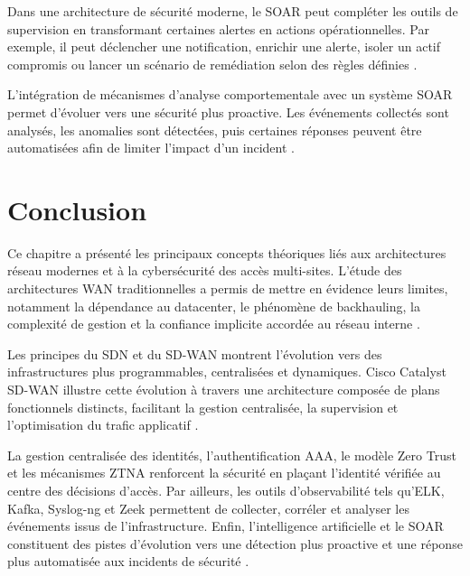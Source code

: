 \documentclass[12pt,a4paper,oneside]{report}
\begin{document}
	Dans une architecture de sécurité moderne, le SOAR peut compléter les outils de supervision en transformant certaines alertes en actions opérationnelles. Par exemple, il peut déclencher une notification, enrichir une alerte, isoler un actif compromis ou lancer un scénario de remédiation selon des règles définies \cite{elastic_stack_docs,nist_zero_trust}.
	
	L'intégration de mécanismes d'analyse comportementale avec un système SOAR permet d'évoluer vers une sécurité plus proactive. Les événements collectés sont analysés, les anomalies sont détectées, puis certaines réponses peuvent être automatisées afin de limiter l'impact d'un incident \cite{elastic_stack_docs,zeek_docs,nist_zero_trust}.
	
	\section{Conclusion}
	
	Ce chapitre a présenté les principaux concepts théoriques liés aux architectures réseau modernes et à la cybersécurité des accès multi-sites. L'étude des architectures WAN traditionnelles a permis de mettre en évidence leurs limites, notamment la dépendance au datacenter, le phénomène de backhauling, la complexité de gestion et la confiance implicite accordée au réseau interne \cite{cisco_sdw_design,nist_zero_trust}.
	
	Les principes du SDN et du SD-WAN montrent l'évolution vers des infrastructures plus programmables, centralisées et dynamiques. Cisco Catalyst SD-WAN illustre cette évolution à travers une architecture composée de plans fonctionnels distincts, facilitant la gestion centralisée, la supervision et l'optimisation du trafic applicatif \cite{onf_sdn_arch,cisco_sdw_design}.
	
	La gestion centralisée des identités, l'authentification AAA, le modèle Zero Trust et les mécanismes ZTNA renforcent la sécurité en plaçant l'identité vérifiée au centre des décisions d'accès. Par ailleurs, les outils d'observabilité tels qu'ELK, Kafka, Syslog-ng et Zeek permettent de collecter, corréler et analyser les événements issus de l'infrastructure. Enfin, l'intelligence artificielle et le SOAR constituent des pistes d'évolution vers une détection plus proactive et une réponse plus automatisée aux incidents de sécurité \cite{rfc2865_radius,rfc4511_ldap,openziti_docs,elastic_stack_docs,zeek_docs}.
	
\end{document}
